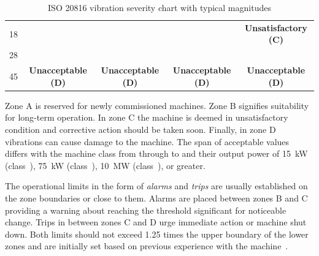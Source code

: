 \begin{table}[h]
\begin{adjustbox}{width=\columnwidth,center}
\begin{tabular}{|c|c|c|c|c|}
18                                                                                   & \cellcolor[HTML]{FD6864}                                                  & \cellcolor[HTML]{FD6864}                                                    & \cellcolor[HTML]{FD6864}                                                                     & \multirow{-2}{*}{\cellcolor[HTML]{F8A102}\textbf{Unsatisfactory (C)}}                         \\ \cline{1-1} \cline{5-5}
28                                                                                   & \cellcolor[HTML]{FD6864}                                                  & \cellcolor[HTML]{FD6864}                                                    & \cellcolor[HTML]{FD6864}                                                                     & \cellcolor[HTML]{FD6864}                                                                      \\ \cline{1-1}
45                                                                                   & \multirow{-5}{*}{\cellcolor[HTML]{FD6864}\textbf{Unacceptable (D)}}       & \multirow{-4}{*}{\cellcolor[HTML]{FD6864}\textbf{Unacceptable (D)}}         & \multirow{-3}{*}{\cellcolor[HTML]{FD6864}\textbf{Unacceptable (D)}}                          & \multirow{-2}{*}{\cellcolor[HTML]{FD6864}\textbf{Unacceptable (D)}}                           \\ \hline
\end{tabular}
\end{adjustbox}
\caption{ISO 20816 vibration severity chart with typical magnitudes \cite{noauthor_iso_2016}}
\label{tab:iso20816-vibration-severity}
\end{table}

Zone A is reserved for newly commissioned machines. Zone B signifies suitability for long-term operation. In zone C the machine is deemed in unsatisfactory condition and corrective action should be taken soon. Finally, in zone D vibrations can cause damage to the machine. The span of acceptable values differs with the machine class from  through to  and their output power of 15~kW (class~), 75~kW (class~), 10~MW (class~), or greater.

The operational limits in the form of \emph{alarms} and \emph{trips} are usually established on the zone boundaries or close to them. Alarms are placed between zones B and C providing a warning about reaching the threshold significant for noticeable change. Trips in between zones C and D urge immediate action or machine shut down. Both limits should not exceed 1.25 times the upper boundary of the lower zones and are initially set based on previous experience with the machine~\cite{noauthor_iso_2002}.

